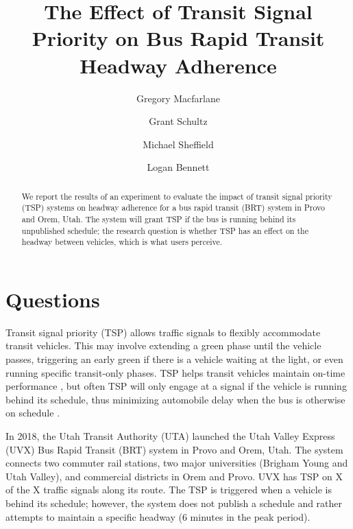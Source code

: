 \documentclass[3p, authoryear, review]{elsarticle} %
\begin{document}
\begin{frontmatter}

  \title{The Effect of Transit Signal Priority on Bus Rapid Transit Headway Adherence}
    \author[Brigham Young University]{Gregory Macfarlane}
    \author[Brigham Young University]{Grant Schultz}
    \author[WCEC]{Michael Sheffield}
    \author[Brigham Young University]{Logan Bennett}
      \address[Brigham Young University]{Civil and Environmental Engineering Department, 430 Engineering Building, Provo, Utah 84602}
    \address[WCEC]{Some other place}
  
  \begin{abstract}
  We report the results of an experiment to evaluate the impact of transit
  signal priority (TSP) systems on headway adherence for a bus rapid transit (BRT) system
  in Provo and Orem, Utah. The system will grant TSP if the bus is running behind
  its unpublished schedule; the research question is whether TSP has an effect on
  the headway between vehicles, which is what users perceive.
  \end{abstract}
  
 \end{frontmatter}

\hypertarget{intro}{%
\section{Questions}\label{intro}}

Transit signal priority (TSP) allows traffic signals to flexibly accommodate
transit vehicles. This may involve extending a green phase until the vehicle
passes, triggering an early green if there is a vehicle waiting at the light, or
even running specific transit-only phases. TSP helps transit vehicles maintain
on-time performance \citep{Liu2018}, but often TSP will only engage at a signal if
the vehicle is running behind its schedule, thus minimizing automobile delay
when the bus is otherwise on schedule \citep{NI20201}.

In 2018, the Utah Transit Authority (UTA) launched the Utah Valley Express (UVX)
Bus Rapid Transit (BRT) system in Provo and Orem, Utah. The system connects
two commuter rail stations, two major universities (Brigham Young and Utah Valley),
and commercial districts in Orem and Provo. UVX has TSP on X of the X traffic
signals along its route. The TSP is triggered when a vehicle is behind its schedule;
however, the system does not publish a schedule and rather attempts to maintain
a specific headway (6 minutes in the peak period).
\end{document}
